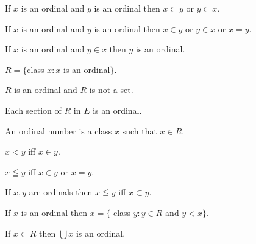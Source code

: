 \documentclass[a4paper,draft]{amsproc}
\begin{document}
\begin{forthel}
\begin{theorem}[109]
If $x$ is an ordinal and $y$ is an ordinal then $x \subset y$ or $y \subset x$.
\end{theorem}

\begin{theorem}[110]
If $x$ is an ordinal and $y$ is an ordinal then $x \in y$ or $y \in x$ or $x = y$.
\end{theorem}

\begin{theorem}[111]
If $x$ is an ordinal and $y \in x$ then $y$ is an ordinal.
\end{theorem}

\begin{definition}
$R = \{$class $x : x$ is an ordinal$\}$.
\end{definition}

\begin{theorem}[113]
$R$ is an ordinal and $R$ is not a set.
\end{theorem}

\begin{theorem}[114]
Each section of $R$ in $E$ is an ordinal.
\end{theorem}

\begin{definition}[115]
An ordinal number is a class $x$ such that $x \in R$.
\end{definition}

\begin{definition}[116]
$x < y$ iff $x \in y$.
\end{definition}

\begin{definition}[117]
$x \leqq y$ iff $x \in y$ or $x = y$.
\end{definition}

\begin{theorem}[118]
If $x, y$ are ordinals then $x \leqq y$ iff $x \subset y$.
\end{theorem}

\begin{theorem}[119]
If $x$ is an ordinal then $x = \{$ class $y : y \in R$ and $y < x\}$.
\end{theorem}

\begin{theorem}[120]
If $x \subset R$ then $\bigcup x$ is an ordinal.
\end{theorem}


\end{forthel}
\end{document}

